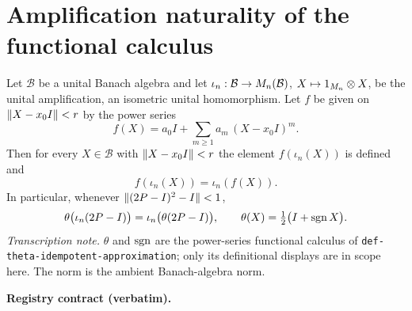 \section{Amplification naturality of the functional calculus}\label{sec:compcb-amplification-naturality}

\begin{lemma}\label{lem:compcb-amplification-naturality}
Let $\mathcal B$ be a unital Banach algebra and let
$\iota_n:\mathcal B\to M_{n}(\mathcal B)$, $X\mapsto1_{M_{n}}\otimes X$, be the unital
amplification, an isometric unital homomorphism. Let $f$ be given on
$\lVert X-x_0I\rVert<r$ by the power series
\begin{equation}\label{eq:an-series}
  f(X)=a_0I+\sum_{m\ge1}a_m\,(X-x_0I)^{m}.
\end{equation}
Then for every $X\in\mathcal B$ with $\lVert X-x_0I\rVert<r$ the element $f(\iota_n(X))$ is
defined and
\begin{equation}\label{eq:an-natural}
  f(\iota_n(X))=\iota_n(f(X)).
\end{equation}
In particular, whenever $\lVert (2P-I)^2-I\rVert<1$,
\[
  \theta\bigl(\iota_n(2P-I)\bigr)=\iota_n\bigl(\theta(2P-I)\bigr),
  \qquad \theta(X)=\tfrac12\bigl(I+\operatorname{sgn} X\bigr).
\]
\emph{Transcription note.} $\theta$ and $\operatorname{sgn}$ are the power-series functional calculus
of \texttt{def-theta-idempotent-approximation}; only its definitional displays are in
scope here. The norm is the ambient Banach-algebra norm.
\end{lemma}

\noindent\textbf{Registry contract (verbatim).}

